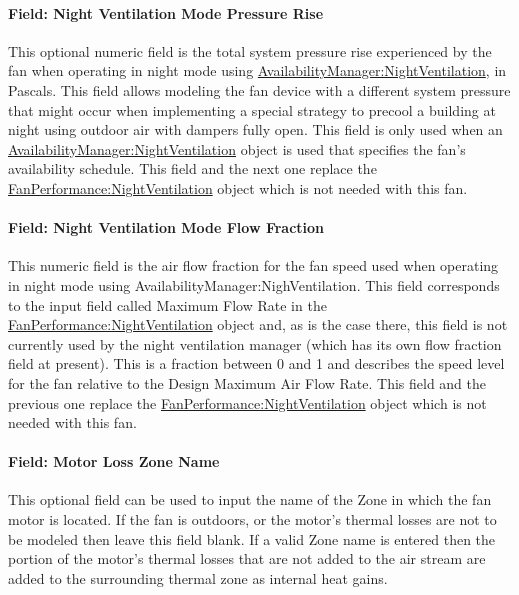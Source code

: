 \paragraph{Field: Night Ventilation Mode Pressure Rise}\label{field-nite-vent-pressure-fansysmodel}

This optional numeric field is the total system pressure rise experienced by the fan when operating in night mode using \hyperref[availabilitymanagernightventilation]{AvailabilityManager:NightVentilation}, in Pascals.  This field allows modeling the fan device with a different system pressure that might occur when implementing a special strategy to precool a building at night using outdoor air with dampers fully open.  This field is only used when an \hyperref[availabilitymanagernightventilation]{AvailabilityManager:NightVentilation} object is used that specifies the fan's availability schedule.  This field and the next one replace the \hyperref[fanperformancenightventilation]{FanPerformance:NightVentilation} object which is not needed with this fan.

\paragraph{Field: Night Ventilation Mode Flow Fraction}\label{field-nite-vent-flow-fraction-fansysmodel}

This numeric field is the air flow fraction for the fan speed used when operating in night mode using AvailabilityManager:NighVentilation.  This field corresponds to the input field called Maximum Flow Rate in the \hyperref[fanperformancenightventilation]{FanPerformance:NightVentilation} object and, as is the case there, this field is not currently used by the night ventilation manager (which has its own flow fraction field at present).  This is a fraction between 0 and 1 and describes the speed level for the fan relative to the Design Maximum Air Flow Rate.  This field and the previous one replace the \hyperref[fanperformancenightventilation]{FanPerformance:NightVentilation} object which is not needed with this fan.

\paragraph{Field: Motor Loss Zone Name}\label{field-loss-zone-name-fansysmodel}

This optional field can be used to input the name of the Zone in which the fan motor is located.  If the fan is outdoors, or the motor's thermal losses are not to be modeled then leave this field blank.  If a valid Zone name is entered then the portion of the motor's thermal losses that are not added to the air stream are added to the surrounding thermal zone as internal heat gains.

